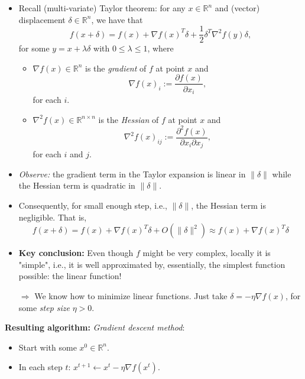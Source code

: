 \documentclass{article}
\newcommand{\RR}{\mathbb{R}}
\begin{document}
\begin{itemize}
\item Recall (multi-variate) Taylor theorem: for any $x\in \RR^n$ and (vector) displacement $\delta\in \RR^n$, we have that
\[
f(x+\delta)= f(x) + \nabla f(x)^T \delta + \frac{1}{2} \delta^T\nabla^2 f(y) \delta,
\]
for some $y=x+\lambda\delta$ with $0\leq \lambda\leq 1$, where
\begin{itemize}
\item $\nabla f(x)\in \RR^n$ is the {\em gradient} of $f$ at point $x$ and 
\[
\nabla f(x)_i:=\frac{\partial f(x)}{\partial x_i},
\]
for each $i$. 
\item $\nabla^2 f(x)\in \RR^{n\times n}$ is the {\em Hessian} of $f$ at point $x$ and 
\[
\nabla^2 f(x)_{ij} := \frac{\partial^2 f(x)}{\partial x_i \partial x_j},
\]
for each $i$ and $j$. 
\end{itemize}
\item {\em Observe:} the gradient term in the Taylor expansion is linear in $\|\delta\|$ while the Hessian term is quadratic in $\|\delta\|$.
\item Consequently, for small enough step, i.e., $\|\delta\|$, the Hessian term is negligible. That is, 
\[
f(x+\delta)= f(x) + \nabla f(x)^T \delta + O(\|\delta\|^2)\approx f(x)+\nabla f(x)^T \delta
\]
\item {\bf Key conclusion:} Even though $f$ might be very complex, locally it is "simple", i.e., it is well approximated by, essentially, the simplest function possible: the linear function!

$\Rightarrow$ We know how to minimize linear functions. Just take $\delta=-\eta \nabla f(x)$, for some {\em step size} $\eta>0$.
\end{itemize}

\textbf{Resulting algorithm:} {\em Gradient descent method}:
\begin{itemize}
\item Start with some $x^0\in \RR^n$. 
\item In each step $t$: $x^{t+1}\leftarrow x^t - \eta \nabla f(x^t)$.
\end{itemize}
\end{document}
